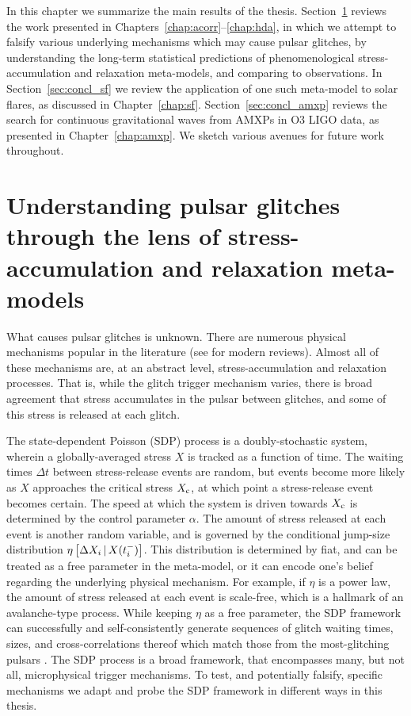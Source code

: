 In this chapter we summarize the main results of the thesis. Section~\ref{sec:concl_glitch} reviews the work presented in Chapters~\ref{chap:acorr}--\ref{chap:hda}, in which we attempt to falsify various underlying mechanisms which may cause pulsar glitches, by understanding the long-term statistical predictions of phenomenological stress-accumulation and relaxation meta-models, and comparing to observations. In Section~\ref{sec:concl_sf} we review the application of one such meta-model to solar flares, as discussed in Chapter~\ref{chap:sf}. Section~\ref{sec:concl_amxp} reviews the search for continuous gravitational waves from AMXPs in O3 LIGO data, as presented in Chapter~\ref{chap:amxp}. We sketch various avenues for future work throughout.

\section[Understanding pulsar glitches through the lens of stress- \linebreak accumulation and relaxation meta-models]{Understanding pulsar glitches through the lens of stress-accumulation and relaxation meta-models} \label{sec:concl_glitch}
What causes pulsar glitches is unknown. There are numerous physical mechanisms popular in the literature (see \citet{Haskell2015,Antonopoulou2022,Antonelli2022,Zhou2022} for modern reviews). Almost all of these mechanisms are, at an abstract level, stress-accumulation and relaxation processes. That is, while the glitch trigger mechanism varies, there is broad agreement that stress accumulates in the pulsar between glitches, and some of this stress is released at each glitch.

The state-dependent Poisson (SDP) process is a doubly-stochastic system, wherein a globally-averaged stress $X$ is tracked as a function of time. The waiting times $\Delta t$ between stress-release events are random, but events become more likely as $X$ approaches the critical stress $X_\textrm{c}$, at which point a stress-release event becomes certain. The speed at which the system is driven towards $X_\textrm{c}$ is determined by the control parameter $\alpha$. The amount of stress released at each event is another random variable, and is governed by the conditional jump-size distribution $\eta\left[\Delta X_{i}\,|\,X(t_i^-)\right]$. This distribution is determined by fiat, and can be treated as a free parameter in the meta-model, or it can encode one's belief regarding the underlying physical mechanism. For example, if $\eta$ is a power law, the amount of stress released at each event is scale-free, which is a hallmark of an avalanche-type process. While keeping $\eta$ as a free parameter, the SDP framework can successfully and self-consistently generate sequences of glitch waiting times, sizes, and cross-correlations thereof which match those from the most-glitching pulsars \citep{Fulgenzi2017,Melatos2018,Carlin2019quasi}. The SDP process is a broad framework, that encompasses many, but not all, microphysical trigger mechanisms. To test, and potentially falsify, specific mechanisms we adapt and probe the SDP framework in different ways in this thesis.

